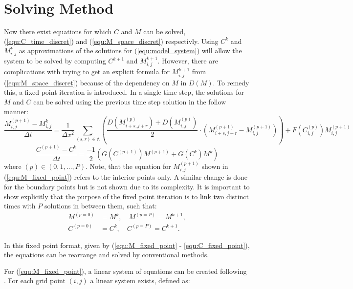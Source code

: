 \section{Solving Method}

Now there exist equations for which $C$ and $M$ can be solved, (\ref{equ:C_time_discret}) and (\ref{equ:M_space_discret}) respectivly.
Using $C^{k}$ and $M^{k}_{i,j}$ as approximations of the solutions for (\ref{equ:model_system}) will allow the system to be solved by computing $C^{k+1}$ and $M^{k+1}_{i,j}$.
However, there are complications with trying to get an explicit formula for $M^{k+1}_{i,j}$ from (\ref{equ:M_space_discret}) because of the dependency on $M$ in $D(M)$. 
To remedy this, a fixed point iteration is introduced.
In a single time step, the solutions for $M$ and $C$ can be solved using the previous time step solution in the follow manner:
\begin{equation} \label{equ:M_fixed_point}
  \frac{M^{(p+1)}_{i,j} - M^{k}_{i,j}}{\Delta t} = 
    \frac{1}{\Delta x^2} \sum_{(s,r) \in \mathbb{A}}
    \left( \frac{D(M^{(p)}_{i+s,j+r}) + D(M^{(p)}_{i,j})}{2} \cdot
    ( M^{(p+1)}_{i+s, j+r} - M^{(p+1)}_{i,j}) \right) 
    + F(C^{(p)}_{i,j}) M^{(p+1)}_{i,j}
\end{equation}
\begin{equation} \label{equ:C_fixed_point}
  \frac{C^{(p+1)} - C^{k}}{\Delta t} = \frac{-1}{2} ( G(C^{(p+1)}) M^{(p+1)} + G(C^{k}) M^{k} )
\end{equation}
where $(p) \in (0,1,\ldots,P)$.
Note, that the equation for $M^{(p+1)}_{i,j}$ shown in (\ref{equ:M_fixed_point}) refers to the interior points only.
A similar change is done for the boundary points but is not shown due to its complexity.
It is important to show explicitly that the purpose of the fixed point iteration is to link two distinct times with $P$ solutions in between them, such that:
\begin{equation}
  \begin{aligned}
  M^{(p=0)} &= M^{k}, \quad M^{(p=P)} = M^{k+1}, \\
  C^{(p=0)} &= C^{k}, \quad C^{(p=P)} = C^{k+1}.
  \end{aligned}
\end{equation}

In this fixed point format, given by (\ref{equ:M_fixed_point} - \ref{equ:C_fixed_point}), the equations can be rearrange and solved by conventional methods.

For (\ref{equ:M_fixed_point}), a linear system of equations can be created following \cite{saad2003iterativeMethod}.
For each grid point $(i,j)$ a linear system exists, defined as:


